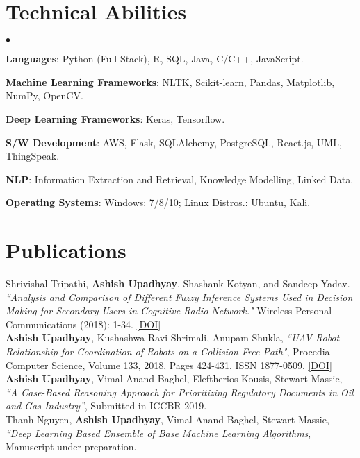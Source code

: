 \documentclass[margin,line]{res}
\newenvironment{list2}{
  \begin{list}{$\bullet$}{%
      \setlength{\itemsep}{0in}
      \setlength{\parsep}{0in} \setlength{\parskip}{0in}
      \setlength{\topsep}{0in} \setlength{\partopsep}{0in} 
      \setlength{\leftmargin}{0.2in}}}{\end{list}}
\begin{document}
\begin{resume}
\vspace{-.2cm}
\section{\sc Technical Abilities}
\begin{list2}
\item {\bf Languages}:  Python (Full-Stack), R, SQL, Java, C/C++, JavaScript.
\item {\bf Machine Learning Frameworks}: NLTK, Scikit-learn, Pandas, Matplotlib, NumPy, OpenCV.
\item {\bf Deep Learning Frameworks}: Keras, Tensorflow.
\item {\bf S/W Development}: AWS, Flask, SQLAlchemy, PostgreSQL, React.js, UML, ThingSpeak.
\item {\bf NLP}: Information Extraction and Retrieval, Knowledge Modelling, Linked Data.
\item {\bf Operating Systems}:  Windows: 7/8/10; Linux Distros.: Ubuntu, Kali.
\end{list2}

\section{\sc Publications}
Shrivishal Tripathi, {\bf Ashish Upadhyay}, Shashank Kotyan, and Sandeep Yadav. {\em ``Analysis and Comparison of Different Fuzzy Inference Systems Used in Decision Making for Secondary Users in Cognitive Radio Network."} Wireless Personal Communications (2018): 1-34. \textcolor{blue}{\href{https://doi.org/10.1007/s11277-018-6075-9
}{[DOI]}}
\vspace{.1cm}\\
{\bf Ashish Upadhyay}, Kushashwa Ravi Shrimali, Anupam Shukla,
{\em ``UAV-Robot Relationship for Coordination of Robots on a Collision Free Path"}, Procedia Computer Science, Volume 133, 2018, Pages 424-431, ISSN 1877-0509. \textcolor{blue}{\href{https://doi.org/10.1016/j.procs.2018.07.052}{[DOI]}}
\vspace{.1cm}\\
{\bf Ashish Upadhyay}, Vimal Anand Baghel, Eleftherios Kousis, Stewart Massie, {\em ``A Case-Based Reasoning Approach for Prioritizing Regulatory Documents in Oil and Gas Industry''}, Submitted in ICCBR 2019.\\
\vspace{.1cm}
Thanh Nguyen, {\bf Ashish Upadhyay}, Vimal Anand Baghel, Stewart Massie, {\em ``Deep Learning Based Ensemble of Base Machine Learning Algorithms}, Manuscript under preparation.


\end{resume}
\end{document}
